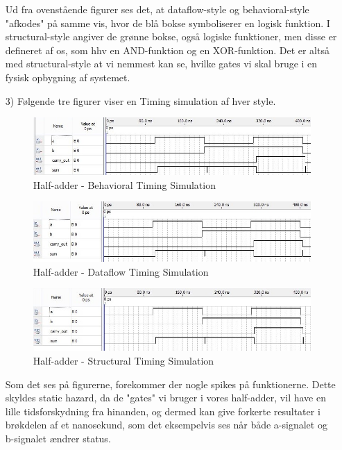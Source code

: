 \begin{enumerate}
	Ud fra ovenstående figurer ses det, at dataflow-style og behavioral-style "afkodes" på samme vis, hvor de blå bokse symboliserer en logisk funktion. I structural-style angiver de grønne bokse, også logiske funktioner, men disse er defineret af os, som hhv en AND-funktion og en XOR-funktion. Det er altså med structural-style at vi nemmest kan se, hvilke gates vi skal bruge i en fysisk opbygning af systemet.\\

	\item[3)]
	Følgende tre figurer viser en Timing simulation af hver style. \\
\begin{figure}[h]
	\centering
	\includegraphics[scale=0.6]{pictures/Oevelse1/Half_adder/Behavioral_timing_simulation.jpg}
	\caption{Half-adder - Behavioral Timing Simulation}
	\label{fig:HaBehavioralTimingSim}
\end{figure}
\begin{figure}[h]
	\centering
	\includegraphics[scale=0.6]{pictures/Oevelse1/Half_adder/Dataflow_timing_simulation.jpg}
	\caption{Half-adder - Dataflow Timing Simulation}
	\label{fig:HaDatalfowTimingSim}
\end{figure}
\begin{figure}[h]
	\centering
	\includegraphics[scale=0.6]{pictures/Oevelse1/Half_adder/Structural_timing_simulation.jpg}
	\caption{Half-adder - Structural Timing Simulation}
	\label{fig:HaStructuralTimingSim}
\end{figure}
	\newpage
	Som det ses på figurerne, forekommer der nogle spikes på funktionerne. Dette skyldes static hazard, da de "gates" vi bruger i vores half-adder, vil have en lille tidsforskydning fra hinanden, og dermed kan give forkerte resultater i brøkdelen af et nanosekund, som det eksempelvis ses når både a-signalet og b-signalet ændrer status.

\end{enumerate}

